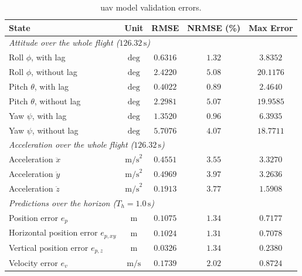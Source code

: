 \begin{table}[!htbp]
    \centering
    \caption{\Gls{uav} model validation errors.}
    \label{tab:uav_validation_metrics}
    \begin{tabular}{lcccc}
        \toprule
        \textbf{State} & \textbf{Unit} & \textbf{RMSE} & \textbf{NRMSE (\%)} & \textbf{Max Error} \\
        \midrule
        \multicolumn{5}{l}{\textit{Attitude over the whole flight ($126.32\,\text{s}$)}} \\
        Roll $\phi$, with lag & $\text{deg}$ & $0.6316$ & $1.32$ & $3.8352$ \\
        Roll $\phi$, without lag & $\text{deg}$ & $2.4220$ & $5.08$ & $20.1176$ \\
        Pitch $\theta$, with lag & $\text{deg}$ & $0.4022$ & $0.89$ & $2.4640$ \\
        Pitch $\theta$, without lag & $\text{deg}$ & $2.2981$ & $5.07$ & $19.9585$ \\
        Yaw $\psi$, with lag & $\text{deg}$ & $1.3520$ & $0.96$ & $6.3935$ \\
        Yaw $\psi$, without lag & $\text{deg}$ & $5.7076$ & $4.07$ & $18.7711$ \\
        \midrule
        \multicolumn{5}{l}{\textit{Acceleration over the whole flight ($126.32\,\text{s}$)}} \\
        Acceleration $\ddot{x}$ & $\text{m/s}^2$ & $0.4551$ & $3.55$ & $3.3270$ \\
        Acceleration $\ddot{y}$ & $\text{m/s}^2$ & $0.4969$ & $3.97$ & $3.2636$ \\
        Acceleration $\ddot{z}$ & $\text{m/s}^2$ & $0.1913$ & $3.77$ & $1.5908$ \\
        \midrule
        \multicolumn{5}{l}{\textit{Predictions over the horizon ($T_h = 1.0\,\text{s}$)}} \\
        Position error $e_p$ & $\text{m}$ & $0.1075$ & $1.34$ & $0.7177$ \\
        Horizontal position error $e_{p,xy}$ & $\text{m}$ & $0.1024$ & $1.31$ & $0.7078$ \\
        Vertical position error $e_{p,z}$ & $\text{m}$ & $0.0326$ & $1.34$ & $0.2380$ \\
        Velocity error $e_v$ & $\text{m/s}$ & $0.1739$ & $2.02$ & $0.8724$ \\
        \bottomrule
    \end{tabular}
\end{table}



